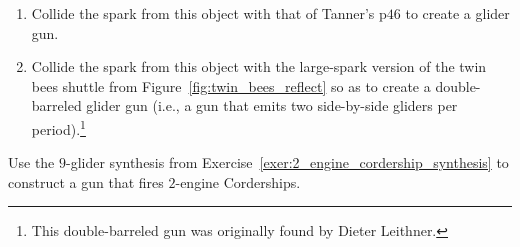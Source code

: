 \begin{multicols}{2}
\begin{problem}
		\begin{enumerate}[label=\bf\color{ocre}(\alph*)]
			\item {} Collide the spark from this object with that of Tanner's p$46$ to create a glider gun.
			
			
			\item {} Collide the spark from this object with the large-spark version of the twin bees shuttle from Figure~\ref{fig:twin_bees_reflect} so as to create a double-barreled glider gun (i.e., a gun that emits two side-by-side gliders per period).\footnote{This double-barreled gun was originally found by Dieter Leithner.}
		\end{enumerate}
	\end{problem}
	
	
	\mfilbreak
	
	
	\begin{problem}\label{exer:2eng_corder_gun} 
		Use the $9$-glider synthesis from Exercise~\ref{exer:2_engine_cordership_synthesis} to construct a gun that fires $2$-engine Corderships.
		
	\end{problem}
	

\end{multicols}
